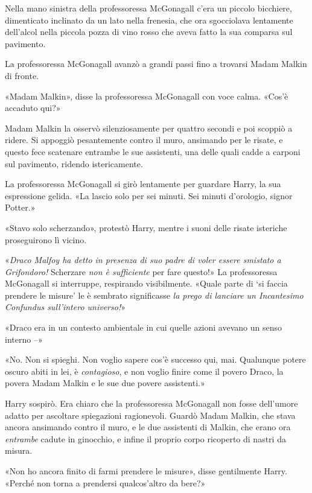 Nella mano sinistra della professoressa McGonagall c’era un piccolo bicchiere, dimenticato inclinato da un lato nella frenesia, che ora sgocciolava lentamente dell’alcol nella piccola pozza di vino rosso che aveva fatto la sua comparsa sul pavimento.

La professoressa McGonagall avanzò a grandi passi fino a trovarsi Madam Malkin di fronte.

«Madam Malkin», disse la professoressa McGonagall con voce calma. «Cos’è accaduto qui?»

Madam Malkin la osservò silenziosamente per quattro secondi e poi scoppiò a ridere. Si appoggiò pesantemente contro il muro, ansimando per le risate, e questo fece scatenare entrambe le sue assistenti, una delle quali cadde a carponi sul pavimento, ridendo istericamente.

La professoressa McGonagall si girò lentamente per guardare Harry, la sua espressione gelida. «La lascio solo per sei minuti. Sei minuti d’orologio, signor Potter.»

«Stavo solo scherzando», protestò Harry, mentre i suoni delle risate isteriche proseguirono lì vicino.

«\textit{Draco Malfoy ha detto in presenza di suo padre di voler essere smistato a Grifondoro!} Scherzare \textit{non è sufficiente} per fare questo!» La professoressa McGonagall si interruppe, respirando visibilmente. «Quale parte di ‘si faccia prendere le misure’ le è sembrato significasse \textit{la prego di lanciare un Incantesimo Confundus sull’intero universo!}»

«Draco era in un contesto ambientale in cui quelle azioni avevano un senso interno –»

«No. Non si spieghi. Non voglio sapere cos’è successo qui, mai. Qualunque potere oscuro abiti in lei, è \textit{contagioso}, e non voglio finire come il povero Draco, la povera Madam Malkin e le sue due povere assistenti.»

Harry sospirò. Era chiaro che la professoressa McGonagall non fosse dell’umore adatto per ascoltare spiegazioni ragionevoli. Guardò Madam Malkin, che stava ancora ansimando contro il muro, e le due assistenti di Malkin, che erano ora \textit{entrambe} cadute in ginocchio, e infine il proprio corpo ricoperto di nastri da misura.

«Non ho ancora finito di farmi prendere le misure», disse gentilmente Harry. «Perché non torna a prendersi qualcos’altro da bere?»
